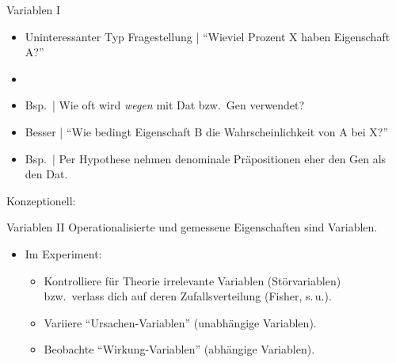 \begin{frame}
  {Variablen I}
  \begin{itemize}[<+->]
    \item Uninteressanter Typ Fragestellung | "`Wieviel Prozent X haben Eigenschaft A?"'
    \item {}
    \item Bsp.\ | Wie oft wird \textit{wegen} mit Dat bzw.\ Gen verwendet?
      \Halbzeile
    \item Besser | "`Wie bedingt Eigenschaft B die Wahrscheinlichkeit von A bei X?"'
    \item Bsp.\ | Per Hypothese nehmen denominale Präpositionen eher den Gen als den Dat.
  \end{itemize}
  \pause
  \Halbzeile
  \begin{center}
    Konzeptionell:
  \end{center}
\end{frame}

\begin{frame}
  {Variablen II}
  Operationalisierte und gemessene Eigenschaften sind \alert{Variablen}.\\
  \Zeile
  \begin{itemize}[<+->]
    \item Im Experiment:
      \Halbzeile
      \begin{itemize}[<+->]
	\item \alert{Kontrolliere} für Theorie irrelevante Variablen (\alert{Störvariablen})\\
          bzw.\ verlass dich auf deren Zufallsverteilung (Fisher, s.\,u.).
          \Viertelzeile
	\item \alert{Variiere} "`Ursachen-Variablen"' (\alert{unabhängige Variablen}).
          \Viertelzeile
	\item \alert{Beobachte} "`Wirkung-Variablen"' (\alert{abhängige Variablen}).
      \end{itemize}
  \end{itemize}
\end{frame}

